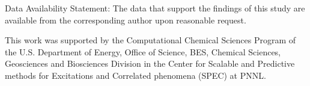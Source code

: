 \documentclass[aps,prb,twocolumn,groupaddress,floatfix]{revtex4}
\begin{document}
\medskip

\noindent Data Availability Statement: The data that support the
findings of this study are available from the corresponding author
upon reasonable request.

\begin{acknowledgments}
 This work was supported by the Computational
Chemical Sciences Program of the U.S. Department
of Energy, Office of Science, BES, Chemical Sciences, Geosciences
and Biosciences Division in the Center for Scalable
and Predictive methods for Excitations and Correlated phenomena
(SPEC) at PNNL. 
\end{acknowledgments}



\end{document}
